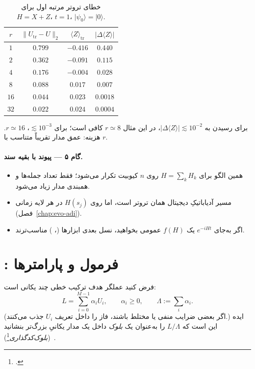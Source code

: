 \begin{table}[htbp]
	\centering
	\footnotesize
	\caption{خطای تروتر مرتبه اول برای $H=X+Z$، $t=1$، $\lvert\psi_0\rangle=\lvert0\rangle$.}
	\label{tab:trotter-error}
	\begin{tabular}{@{}cccc@{}}
		\toprule
		\rowcolor{gray!14}
		$r$ & $\|U_{\mathrm{tr}}-U\|_2$ & $\langle Z\rangle_{\mathrm{tr}}$ & $|\Delta\langle Z\rangle|$ \\
		\midrule
		$1$  & $0.799$ & $-0.416$ & $0.440$ \\
		\rowcolor{gray!8}
		$2$  & $0.362$ & $-0.091$ & $0.115$ \\
		$4$  & $0.176$ & $-0.004$ & $0.028$ \\
		\rowcolor{gray!8}
		$8$  & $0.088$ & $0.017$ & $0.007$ \\
		$16$ & $0.044$ & $0.023$ & $0.0018$ \\
		\rowcolor{gray!8}
		$32$ & $0.022$ & $0.024$ & $0.0004$ \\
		\bottomrule
	\end{tabular}
\end{table}

برای رسیدن به $|\Delta\langle Z\rangle|\lesssim 10^{-2}$، در این مثال $r\simeq 8$ کافی است؛ برای $\lesssim 10^{-3}$، $r\simeq 16$. هزینه: عمق مدار تقریباً متناسب با $r$.

\paragraph{گام ۵ --- پیوند با بقیه سند.}
\begin{itemize}
	\item همین الگو برای $H=\sum_k H_k$ روی $n$ کیوبیت تکرار می‌شود؛ فقط تعداد جمله‌ها و همبندی مدار زیاد می‌شود.
	\item مسیر آدیاباتیکِ دیجیتال همان تروتر است، اما روی $H(s_j)$ در هر لایه زمانی (فصل~\ref{chap:evo-adi}).
	\item اگر به‌جای $e^{-iHt}$ یک $f(H)$ عمومی بخواهید، نسل بعدی ابزارها (، ) مناسب‌ترند.
\end{itemize}

\section{: فرمول و پارامترها}
\label{sec:lcu}

فرض کنید عملگر هدف ترکیب خطی چند یکانی است:
\begin{equation}
	\label{eq:lcu}
	L = \sum_{i=0}^{M-1} \alpha_i U_i,
	\qquad
	\alpha_i\ge 0,
	\qquad
	\Lambda:=\sum_i\alpha_i.
\end{equation}
(اگر بعضی ضرایب منفی یا مختلط باشند، فاز را داخل تعریف $U_i$ جذب می‌کنند.) ایده  این است که $L/\Lambda$ را به‌عنوان یک \emph{بلوک} داخل یک مدار یکانیِ بزرگ‌تر بنشانید (\emph{بلوک‌کدگذاری}\footnote{.})~\cite{Berry2015}.

